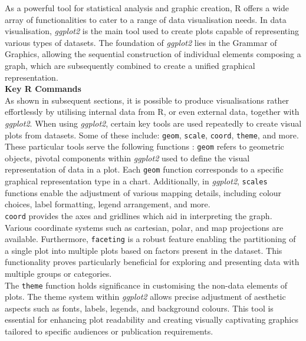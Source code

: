 \documentclass{article}\usepackage[]{graphicx}\usepackage[]{xcolor}
\numberwithin{equation}{section}
\begin{document}
As a powerful tool for statistical analysis and graphic creation, R offers a wide array of functionalities to cater to a range of data visualisation needs. In data visualisation, \textit{ggplot2} is the main tool used to create plots capable of representing various types of datasets. The foundation of \textit{ggplot2} lies in the Grammar of Graphics, allowing the sequential construction of individual elements composing a graph, which are subsequently combined to create a unified graphical representation.\\

\noindent\textbf{Key R Commands}\\
\noindent 
As shown in subsequent sections, it is possible to produce visualisations rather effortlessly by utilising internal data from R, or even external data, together with \textit{ggplot2}. When using \textit{ggplot2}, certain key tools are used repeatedly to create visual plots from datasets. Some of these include: \texttt{geom}, \texttt{scale}, \texttt{coord}, \texttt{theme}, and more.\\


\noindent 
These particular tools serve the following functions \cite{ggplot2}: %
\noindent
\texttt{geom} refers to geometric objects, pivotal components within \textit{ggplot2} used to define the visual representation of data in a plot. Each \texttt{geom} function corresponds to a specific graphical representation type in a chart. Additionally, in \textit{ggplot2}, \texttt{scales} functions enable the adjustment of various mapping details, including colour choices, label formatting, legend arrangement, and more.\\

\noindent \texttt{coord} provides the axes and gridlines which aid in interpreting the graph. Various coordinate systems such as cartesian, polar, and map projections are available. Furthermore, \texttt{faceting} is a robust feature enabling the partitioning of a single plot into multiple plots based on factors present in the dataset. This functionality proves particularly beneficial for exploring and presenting data with multiple groups or categories.\\

\noindent The \texttt{theme} function holds significance in customising the non-data elements of plots. The theme system within \textit{ggplot2} allows precise adjustment of aesthetic aspects such as fonts, labels, legends, and background colours. This tool is essential for enhancing plot readability and creating visually captivating graphics tailored to specific audiences or publication requirements.\\
\\
\\
\end{document}
